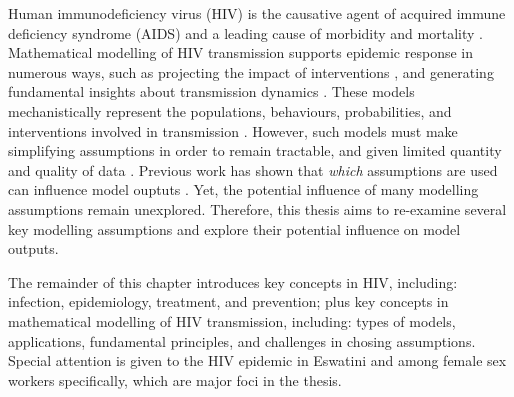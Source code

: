 Human immunodeficiency virus (HIV) is
the causative agent of acquired immune deficiency syndrome (AIDS)
and a leading cause of morbidity and mortality \cite{Maartens2014,GBD2019}.
Mathematical modelling of HIV transmission supports epidemic response in numerous ways, such as
projecting the impact of interventions \cite{Eaton2012}, and
generating fundamental insights about transmission dynamics \cite{Garnett1993}.
These models mechanistically represent the populations, behaviours, probabilities, and interventions
involved in transmission \cite{Garnett2011}.
However, such models must make simplifying assumptions in order to remain tractable,
and given limited quantity and quality of data \cite{Mishra2016,Garnett2011}.
Previous work has shown that \emph{which} assumptions are used can influence model ouptuts
\cite{Garnett1993,Hontelez2013,Mishra2016,Johnson2016mf,Bernard2017,Knight2020}.
Yet, the potential influence of many modelling assumptions remain unexplored.
Therefore, this thesis aims to re-examine several key modelling assumptions
and explore their potential influence on model outputs.
\par
The remainder of this chapter introduces key concepts in HIV, including:
infection, epidemiology, treatment, and prevention;
plus key concepts in mathematical modelling of HIV transmission, including:
types of models, applications, fundamental principles, and challenges in chosing assumptions.
Special attention is given to
the HIV epidemic in Eswatini and among female sex workers specifically,
which are major foci in the thesis.
